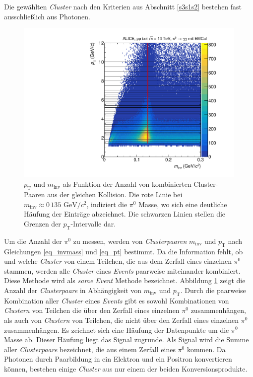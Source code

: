 Die gewählten \textit{Cluster} nach den Kriterien aus Abschnitt \ref{s3s1s2} bestehen fast ausschließlich aus Photonen.
\begin{figure}[t!]
\centering
\includegraphics[width=.7\linewidth]{hInvMass_pT_Signal.pdf}
\caption{$p_\text{T}$ und $m_\text{inv}$ als Funktion der Anzahl von kombinierten  Cluster-Paaren aus der gleichen Kollision.
Die rote Linie bei $m_{\text{inv}}\approx0\,135\text{ GeV/}c^{2}$, indiziert die $\pi^{0}$ Masse, wo sich eine deutliche Häufung der Einträge abzeichnet.
Die schwarzen Linien stellen die Grenzen der $p_{\text{T}}$-Intervalle dar.}
\label{figInvMassPt_a}
\end{figure}
\newline
Um die Anzahl der $\pi^{0}$ zu messen, werden von \textit{Clusterpaaren} $m_\text{inv}$ und $p_\text{T}$ nach Gleichungen \ref{eq_invmass} und \ref{eq_pt} bestimmt.
Da die Information fehlt, ob und welche \textit{Cluster} von einem Teilchen, die aus dem Zerfall eines einzelnen $\pi^{0}$ stammen, werden alle \textit{Cluster} eines \textit{Events} paarweise miteinander kombiniert.
Diese Methode wird als \textit{same Event} Methode bezeichnet.
Abbildung \ref{figInvMassPt_a} zeigt die Anzahl der \textit{Clusterpaare} in Abhängigkeit von $m_{\text{inv}}$ und $p_{\text{T}}$.
Durch die paarweise Kombination aller \textit{Cluster} eines \textit{Events} gibt es sowohl Kombinationen von \textit{Clustern} von Teilchen die über den Zerfall eines einzelnen $\pi^{0}$ zusammenhängen, als auch von \textit{Clustern} von Teilchen, die nicht über den Zerfall eines einzelnen $\pi^{0}$ zusammenhängen.
\newline
Es zeichnet sich eine Häufung der Datenpunkte um die $\pi^{0}$ Masse ab.
Dieser Häufung liegt das Signal zugrunde.
Als Signal wird die Summe aller \textit{Clusterpaare} bezeichnet, die aus einem Zerfall eines $\pi^{0}$ kommen.
Da Photonen durch Paarbildung in ein Elektron und ein Positron konvertieren können, bestehen einige \textit{Cluster} aus nur einem der beiden Konversionsprodukte.
